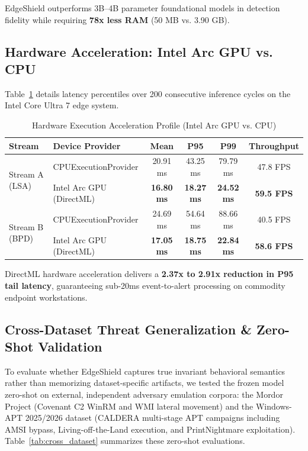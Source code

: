 \documentclass[10pt,journal,compsoc]{IEEEtran}
\begin{document}
EdgeShield outperforms 3B--4B parameter foundational models in detection fidelity while requiring \textbf{78x less RAM} (50 MB vs. 3.90 GB).

\subsection{Hardware Acceleration: Intel Arc GPU vs. CPU}
Table~\ref{tab:hardware} details latency percentiles over 200 consecutive inference cycles on the Intel Core Ultra 7 edge system.

\begin{table}[htbp]
\caption{Hardware Execution Acceleration Profile (Intel Arc GPU vs. CPU)}
\label{tab:hardware}
\centering
\begin{tabular}{llcccc}
\toprule
\textbf{Stream} & \textbf{Device Provider} & \textbf{Mean} & \textbf{P95} & \textbf{P99} & \textbf{Throughput} \\
\midrule
\multirow{2}{*}{Stream A (LSA)} & CPUExecutionProvider   & 20.91 ms & 43.25 ms & 79.79 ms & 47.8 FPS \\
                                & Intel Arc GPU (DirectML)& \textbf{16.80 ms} & \textbf{18.27 ms} & \textbf{24.52 ms} & \textbf{59.5 FPS} \\
\midrule
\multirow{2}{*}{Stream B (BPD)} & CPUExecutionProvider   & 24.69 ms & 54.64 ms & 88.66 ms & 40.5 FPS \\
                                & Intel Arc GPU (DirectML)& \textbf{17.05 ms} & \textbf{18.75 ms} & \textbf{22.84 ms} & \textbf{58.6 FPS} \\
\bottomrule
\end{tabular}
\end{table}

DirectML hardware acceleration delivers a \textbf{2.37x to 2.91x reduction in P95 tail latency}, guaranteeing sub-20ms event-to-alert processing on commodity endpoint workstations.

\subsection{Cross-Dataset Threat Generalization \& Zero-Shot Validation}
To evaluate whether EdgeShield captures true invariant behavioral semantics rather than memorizing dataset-specific artifacts, we tested the frozen model zero-shot on external, independent adversary emulation corpora: the Mordor Project \cite{rodriguez2023mordor} (Covenant C2 WinRM and WMI lateral movement) and the Windows-APT 2025/2026 dataset \cite{mendeley2026apt} (CALDERA multi-stage APT campaigns including AMSI bypass, Living-off-the-Land execution, and PrintNightmare exploitation). Table~\ref{tab:cross_dataset} summarizes these zero-shot evaluations.
\end{document}
